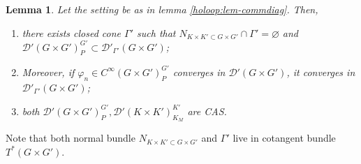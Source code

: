 \documentclass{article}
\newtheorem{lemma}{Lemma}
\begin{document}
\begin{lemma}
  \label{holoop:lem-aux}Let the setting be as in lemma
  \ref{holoop:lem-commdiag}. Then,
  \begin{enumerate}
    \item there exists closed cone $\Gamma'$ such that $N_{K \times K' \subset
    G \times G'} \cap \Gamma' = \varnothing$ and $\mathcal{D}' (G \times
    G')_P^{G'} \subset \mathcal{D}'_{\Gamma'} (G \times G')$;
    
    \item Moreover, if $\varphi_n \in C^{\infty} (G \times G')_P^{G'}$
    converges in $\mathcal{D}' (G \times G')$, it converges in
    $\mathcal{D}'_{\Gamma'} (G \times G')$;
    
    \item both $\mathcal{D}' (G \times G')^{G'}_P, \mathcal{D}' (K \times
    K')_{K_M}^{K'}$ are CAS.
  \end{enumerate}
\end{lemma}

\begin{remark}
  Note that both normal bundle $N_{K \times K' \subset G \times G'}$ and
  $\Gamma'$ live in cotangent bundle $T^{\ast} (G \times G')$.
\end{remark}
\end{document}
